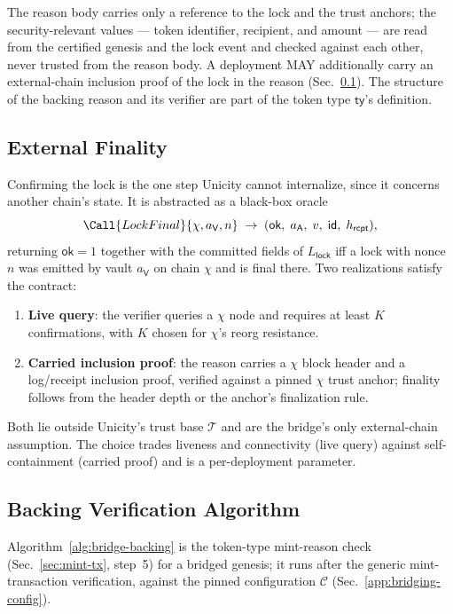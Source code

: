 The reason body carries only a reference to the lock and the trust anchors; the security-relevant values --- token identifier, recipient, and amount --- are read from the certified genesis and the lock event and checked against each other, never trusted from the reason body. A deployment MAY additionally carry an external-chain inclusion proof of the lock in the reason (Sec.~\ref{app:bridging-finality}). The structure of the backing reason and its verifier are part of the token type $\mathsf{ty}$'s definition.

\subsection{External Finality}\label{app:bridging-finality}

Confirming the lock is the one step Unicity cannot internalize, since it concerns another chain's state. It is abstracted as a black-box oracle
\[
\Call{LockFinal}{\chi, a_\mathsf{V}, n} \;\to\; (\mathsf{ok},\; a_\mathsf{A},\; v,\; \mathsf{id},\; h_\mathsf{rcpt}),
\]
returning $\mathsf{ok}=1$ together with the committed fields of $L_\mathsf{lock}$ iff a lock with nonce $n$ was emitted by vault $a_\mathsf{V}$ on chain $\chi$ and is final there. Two realizations satisfy the contract:
\begin{enumerate}
  \item \textbf{Live query}: the verifier queries a $\chi$ node and requires at least $K$ confirmations, with $K$ chosen for $\chi$'s reorg resistance.
  \item \textbf{Carried inclusion proof}: the reason carries a $\chi$ block header and a log/receipt inclusion proof, verified against a pinned $\chi$ trust anchor; finality follows from the header depth or the anchor's finalization rule.
\end{enumerate}
Both lie outside Unicity's trust base $\mathcal{T}$ and are the bridge's only external-chain assumption. The choice trades liveness and connectivity (live query) against self-containment (carried proof) and is a per-deployment parameter.

\subsection{Backing Verification Algorithm}\label{app:bridging-backing}

Algorithm~\ref{alg:bridge-backing} is the token-type mint-reason check (Sec.~\ref{sec:mint-tx}, step~5) for a bridged genesis; it runs after the generic mint-transaction verification, against the pinned configuration $\mathcal{C}$ (Sec.~\ref{app:bridging-config}).

